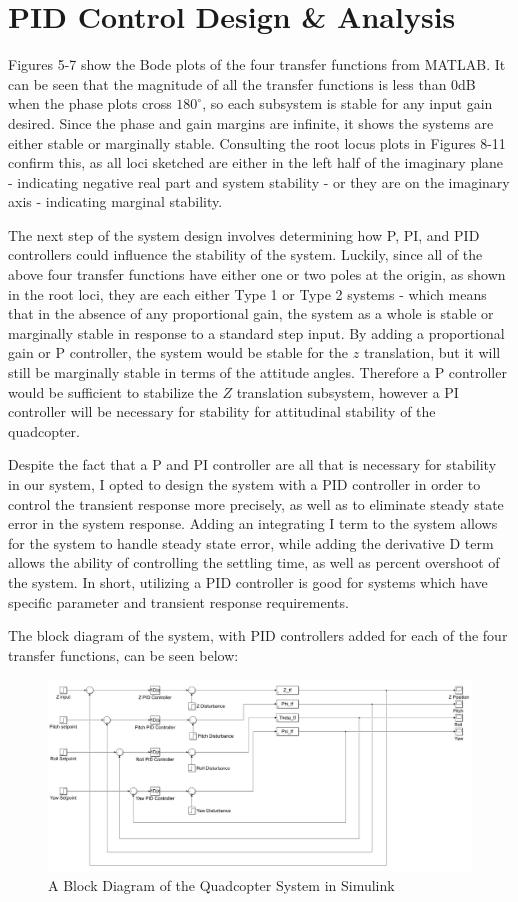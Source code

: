 \documentclass[12pt]{article}
\begin{document}
\section*{PID Control Design \& Analysis}
Figures 5-7 show the Bode plots of the four transfer functions from MATLAB. It can be seen that the magnitude of 
all the transfer functions is less than 0dB when the phase plots cross $180^{\circ}$, so each subsystem is stable 
for any input gain desired. Since the phase and gain margins are infinite, it shows the systems are either stable 
or marginally stable. Consulting the root locus plots in Figures 8-11 confirm this, as all loci sketched are either 
in the left half of the imaginary plane - indicating negative real part and system stability - or they are on the 
imaginary axis - indicating marginal stability.  
\par
The next step of the system design involves determining how P, PI, and PID controllers could influence
the stability of the system. Luckily, since all of the above four transfer functions have either 
one or two poles at the origin, as shown in the root loci, they are each either Type 1 or Type 2 systems - which means that
in the absence of any proportional gain, the system as a whole is stable or marginally stable in response
to a standard step input. By adding a proportional gain or P controller, the system would be stable 
for the $z$ translation, but it will still be marginally stable in terms of the attitude angles. Therefore
a P controller would be sufficient to stabilize the $Z$ translation subsystem, however a PI controller will
be necessary for stability for attitudinal stability of the quadcopter.
\par
Despite the fact that a P and PI controller are all that is necessary for stability in our system, 
I opted to design the system with a PID controller in order to control the transient response more 
precisely, as well as to eliminate steady state error in the system response. Adding an integrating I term
to the system allows for the system to handle steady state error, while adding the derivative D term
allows the ability of controlling the settling time, as well as percent overshoot of the system. In short, 
utilizing a PID controller is good for systems which have specific parameter and transient response requirements.
\par
The block diagram of the system, with PID controllers added for each of the four transfer functions, can be seen below:
\begin{figure}[h]
\includegraphics[width=\linewidth]{images/system_block_diagram.png}
\centering
\caption{A Block Diagram of the Quadcopter System in Simulink}
\end{figure}
\end{document}
